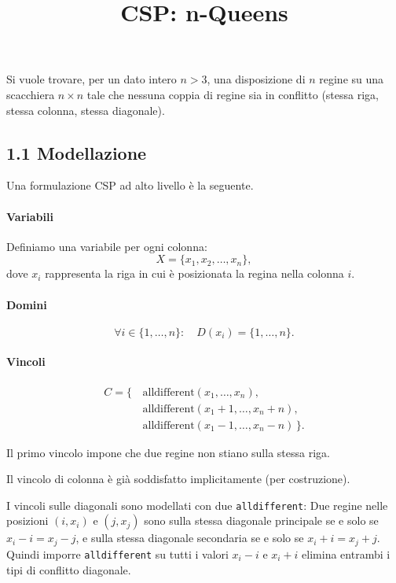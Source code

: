 \documentclass[a4paper,11pt]{article}
\title{CSP: n-Queens}
\date{}
\begin{document}
\maketitle

Si vuole trovare, per un dato intero $n>3$, una disposizione di $n$ regine su una
scacchiera $n\times n$ tale che nessuna coppia di regine sia in conflitto (stessa riga,
stessa colonna, stessa diagonale).

\subsection*{1.1 Modellazione} 
Una formulazione CSP ad alto livello è la seguente.

\paragraph{Variabili}
Definiamo una variabile per ogni colonna:
\[
X = \{x_1, x_2, \dots, x_n\},
\]
dove $x_i$ rappresenta la riga in cui è posizionata la regina nella colonna $i$.

\paragraph{Domini}
\[
\forall i \in \{1,\dots,n\}:\quad D(x_i)=\{1,\dots,n\}.
\]

\paragraph{Vincoli}
\[
\begin{aligned}
C=\{\,&\text{alldifferent}(x_1,\dots,x_n),\\
      &\text{alldifferent}(x_1+1,\dots,x_n+n),\\
      &\text{alldifferent}(x_1-1,\dots,x_n-n)\,\}.
\end{aligned}
\]

Il primo vincolo impone che due regine non stiano sulla stessa riga.

Il vincolo di colonna è già soddisfatto implicitamente (per costruzione).

I vincoli sulle diagonali sono modellati con due \texttt{alldifferent}:
Due regine nelle posizioni $(i,x_i)$ e $(j,x_j)$ sono sulla stessa diagonale
principale se e solo se $x_i-i=x_j-j$, e sulla stessa diagonale secondaria se e solo se
$x_i+i=x_j+j$. 
Quindi imporre \texttt{alldifferent} su tutti i valori $x_i-i$ e $x_i+i$
elimina entrambi i tipi di conflitto diagonale.
\end{document}

